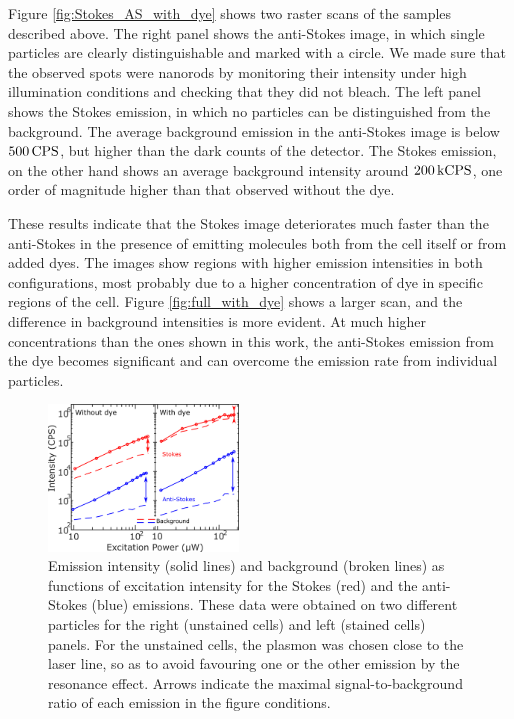 Figure \ref{fig:Stokes_AS_with_dye} shows two raster scans of the samples
described above. The right panel shows the anti-Stokes image, in which single
particles are clearly distinguishable and marked with a circle. We made sure
that the observed spots were nanorods by monitoring their intensity under high
illumination conditions and checking that they did not bleach. The left panel
shows the Stokes emission, in which no particles can be distinguished from the
background. The average background emission in the anti-Stokes image is
below $500\,\textrm{CPS}$, but higher than the dark counts of the detector. The Stokes
emission, on the other hand shows an average background intensity
around $200\,\textrm{kCPS}$, one order of magnitude higher than that observed without the
dye.

These results indicate that the Stokes image deteriorates much faster than the
anti-Stokes in the presence of emitting molecules both from the cell itself or
from added dyes. The images show regions with higher emission intensities in
both configurations, most probably due to a higher concentration of dye in
specific regions of the cell. Figure \ref{fig:full_with_dye} shows a larger
scan, and the difference in background intensities is more evident. At much
higher concentrations than the ones shown in this work, the anti-Stokes emission
from the dye becomes significant and can overcome the emission rate from
individual particles.

\begin{figure}[htp] \centering
\includegraphics[width=0.45\textwidth]{Chapters/03_Background_Free/Figures/06_Power_Intensity/power_intensity.png}
\caption{Emission intensity (solid lines) and background (broken lines) as
functions of excitation intensity for the Stokes (red) and the anti-Stokes
(blue) emissions. These data were obtained on two different particles for the
right (unstained cells) and left (stained cells) panels. For the unstained
cells, the plasmon was chosen close to the laser line, so as to avoid favouring
one or the other emission by the resonance effect. Arrows indicate the maximal
signal-to-background ratio of each emission in the figure conditions. }
	\label{fig:power_intensity}
\end{figure}

